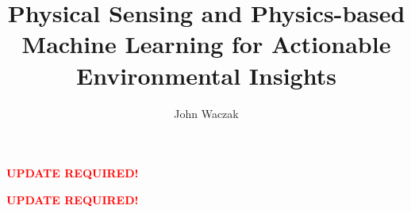 \documentclass[doublespacing]{utdthesis}
\author{John Waczak}
\title{Physical Sensing and Physics-based Machine Learning for Actionable Environmental Insights}
\begin{document}
\frontmatter

\signaturepage



\maketitle






\tableofcontents
\listoffigures %
\listoftables %

\mainmatter




%













% 






\appendix %




\begin{thesisbib}  %
  
\end{thesisbib}  %



\begin{biosketch}
  \textbf{\textcolor{red}{UPDATE REQUIRED!}}
\end{biosketch}


\begin{vita}  %
  \textbf{\textcolor{red}{UPDATE REQUIRED!}}
\end{vita}  %
\end{document}
